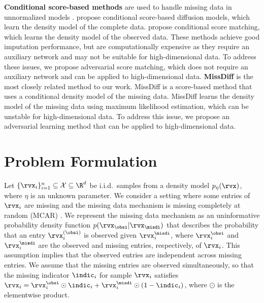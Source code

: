 \textbf{Conditional score-based methods} are used to handle missing data in unnormalized models \citep{Zheng2022, Tashiro2021}. \citet{Tashiro2021} propose conditional score-based diffusion models, which learn the density model of the complete data. \citet{Zheng2022} propose conditional score matching, which learns the density model of the observed data. These methods achieve good imputation performance, but are computationally expensive as they require an auxiliary network and may not be suitable for high-dimensional data. To address these issues, we propose adversarial score matching, which does not require an auxiliary network and can be applied to high-dimensional data.
\textbf{MissDiff} \citep{Ouyang2023} is the most closely related method to our work. MissDiff is a score-based method that uses a conditional density model of the missing data. MissDiff learns the density model of the missing data using maximum likelihood estimation, which can be unstable for high-dimensional data. To address this issue, we propose an adversarial learning method that can be applied to high-dimensional data.



\section{Problem Formulation}

\label{sec:problem}
Let $\{ \rvx_{i} \}_{i=1}^{n} \subseteq \mathcal{X} \subseteq \R^{d}$ be i.i.d.\ samples from a density model $p_{\eta}(\rvx)$, where $\eta$ is an unknown parameter. 
We consider a setting where some entries of $\rvx_{i}$ are missing and the missing data mechanism is missing completely at random (MCAR) \citep{Little2002}. 
We represent the missing data mechanism as an uninformative probability density function $p(\rvx_{\obsi} | \rvx_{\misdi})$ that describes the probability that an entry $\rvx_{i}^{(\obsi)}$ is observed given $\rvx_{i}^{\misdi}$, where $\rvx_{i}^{\obsi}$ and $\rvx_{i}^{\misdi}$ are the observed and missing entries, respectively, of $\rvx_{i}$. This assumption implies that the observed entries are independent across missing entries. We assume that the missing entries are observed simultaneously, so that the missing indicator $\indic_{i}$ for sample $\rvx_{i}$ satisfies $\rvx_{i} = \rvx_{i}^{\obsi} \odot \indic_{i}+ \rvx_{i}^{\misdi} \odot (1-\indic_{i})$, where $\odot$ is the elementwise product.


